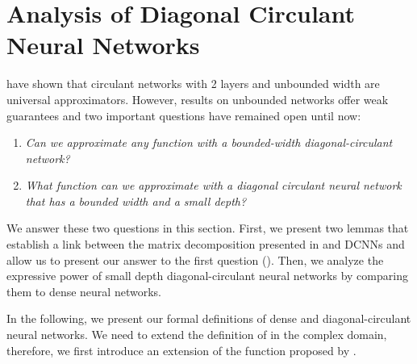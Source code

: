 
\vspace*{2cm}


 \section{Analysis of Diagonal Circulant Neural Networks}
\label{section:ch4-analysis_of_diagonal_circulant_neural_networks}

\citet{zhao2017theoretical} have shown that circulant networks with 2 layers and unbounded width are universal approximators.
However, results on unbounded networks offer weak guarantees and two important questions have remained open until now: 
\begin{enumerate}
  \item \emph{Can we approximate any function with a bounded-width diagonal-circulant network?}
  \item \emph{What function can we approximate with a diagonal circulant neural network that has a bounded width and a small depth?}
\end{enumerate}
We answer these two questions in this section.
First, we present two lemmas that establish a link between the matrix decomposition presented in  and DCNNs and allow us to present our answer to the first question ().
Then, we analyze the expressive power of small depth diagonal-circulant neural networks by comparing them to dense neural networks. 


In the following, we present our formal definitions of dense and diagonal-circulant neural networks.
We need to extend the definition of  in the complex domain, therefore, we first introduce an extension of the \relu function proposed by \citet{trabelsi2018deep}.



